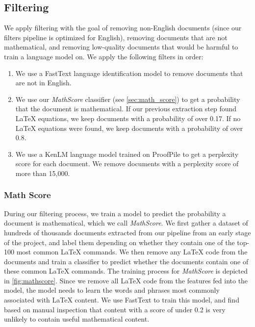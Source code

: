 \subsection{Filtering}
\label{sec:filtering}

We apply filtering with the goal of removing non-English documents (since our filters pipeline is optimized for English), removing documents that are not mathematical, and removing low-quality documents that would be harmful to train a language model on. We apply the following filters in order:

\begin{enumerate}
    \item We use a FastText language identification model \citep{joulin2016fasttext} to remove documents that are not in English.
    \item We use our \textit{MathScore} classifier (see \autoref{sec:math_score}) to get a probability that the document is mathematical. If our previous extraction step found \LaTeX{} equations, we keep documents with a probability of over 0.17. If no \LaTeX{} equations were found, we keep documents with a probability of over 0.8.
    \item We use a KenLM language model \citep{heafield2011kenlm} trained on ProofPile \citep{azerbayev2023proofnet} to get a perplexity score for each document. We remove documents with a perplexity score of more than 15,000.
\end{enumerate}

\subsubsection{Math Score}
\label{sec:math_score}

During our filtering process, we train a model to predict the probability a document is mathematical, which we call \textit{MathScore}. We first gather a dataset of hundreds of thousands documents extracted from our pipeline from an early stage of the project, and label them depending on whether they contain one of the top-100 most common \LaTeX{} commands. We then remove any \LaTeX{} code from the documents and train a classifier to predict whether the documents contain one of these common \LaTeX{} commands. The training process for \textit{MathScore} is depicted in \autoref{fig:mathscore}. Since we remove all \LaTeX{} code from the features fed into the model, the model needs to learn the words and phrases most commonly associated with \LaTeX{} content. We use FastText \citep{joulin2016fasttext} to train this model, and find based on manual inspection that content with a score of under 0.2 is very unlikely to contain useful mathematical content.


